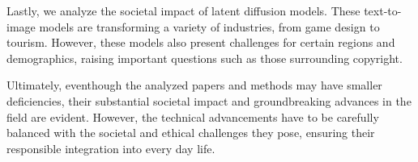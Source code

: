 Lastly, we analyze the societal impact of latent diffusion models. These
text-to-image models are transforming a variety of industries, from game design
to tourism. However, these models also present challenges for certain regions
and demographics, raising important questions such as those surrounding
copyright.

Ultimately, eventhough the analyzed papers and methods may have smaller deficiencies,
their substantial societal impact and groundbreaking advances in the field are evident.
However, the technical advancements have to be carefully balanced with the societal and
ethical challenges they pose, ensuring their responsible integration into every day life.